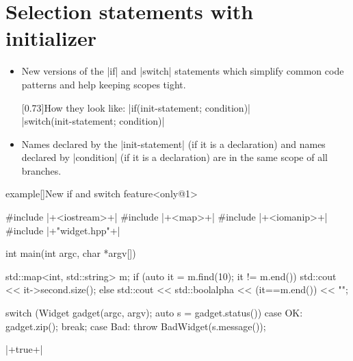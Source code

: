 \section{Selection statements with initializer}
\begin{frame}[fragile]{\insertsectionhead}
    \vspace{-3mm}
    \begin{itemize}
        \item New versions of the \CPP|if| and \CPP|switch| statements which simplify common code patterns and help keeping scopes tight.\\
              \begin{varblock}{}[0.73\textwidth]{How they look like:}
                  \small
                  \CPP|if(init-statement; condition)|\\[1mm]
                  \CPP|switch(init-statement; condition)|
              \end{varblock}
              \par\medskip
        \item Names declared by the \CPP|init-statement| (if it is a declaration) and names declared by \CPP|condition| (if it is a declaration) are in the same scope of all branches.
    \end{itemize}
\end{frame}
\begin{frame}[fragile]{}
    \begin{varblock}{example}[\textwidth]{New if and switch feature}<only@1>
        \begin{Cpp}
            #include |+<iostream>+|
            #include |+<map>+|
            #include |+<iomanip>+|
            #include |+"widget.hpp"+|

            int main(int argc, char *argv[])
            {
                std::map<int, std::string> m;
                if (auto it = m.find(10); it != m.end())
                    std::cout << it->second.size();
                else
                    std::cout << std::boolalpha << (it==m.end()) << "\n";

                switch (Widget gadget(argc, argv);
                        auto s = gadget.status())
                {
                    case OK: gadget.zip(); break;
                    case Bad: throw BadWidget(s.message());
                }
            }
        \end{Cpp}
        \begin{Bash}[numbers=none]
            |+true+|
        \end{Bash}
    \end{varblock}
\end{frame}

